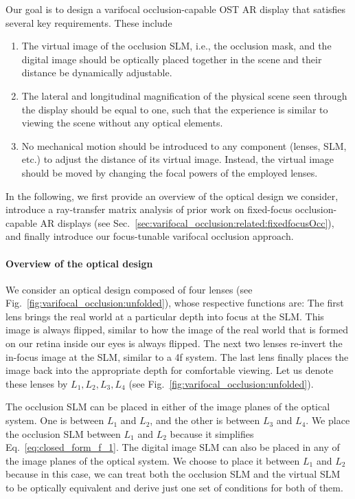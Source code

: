 
Our goal is to design a varifocal occlusion-capable OST AR display that satisfies several key requirements. These include 
%
\begin{enumerate}
    \item The virtual image of the occlusion SLM, i.e., the occlusion mask, and the digital image should be optically placed together in the scene and their distance be dynamically adjustable.
    \item The lateral and longitudinal magnification of the physical scene seen through the display should be equal to one, such that the experience is similar to viewing the scene without any optical elements.
    \item No mechanical motion should be introduced to any component (lenses, SLM, etc.) to adjust the distance of its virtual image. Instead, the virtual image should be moved by changing the focal powers of the employed lenses.
\end{enumerate}
%

In the following, we first provide an overview of the optical design we consider, introduce a ray-transfer matrix analysis of prior work on fixed-focus occlusion-capable AR displays (see Sec.~\ref{sec:varifocal_occlusion:related:fixedfocusOcc}), and finally introduce our focus-tunable varifocal occlusion approach.

\paragraph{\textbf{Overview of the optical design}}
We consider an optical design composed of four lenses (see Fig.~\ref{fig:varifocal_occlusion:unfolded}), whose respective functions are: The first lens brings the real world at a particular depth into focus at the SLM. This image is always flipped, similar to how the image of the real world that is formed on our retina inside our eyes is always flipped. The next two lenses re-invert the in-focus image at the SLM, similar to a 4f system. The last lens finally places the image back into the appropriate depth for comfortable viewing. Let us denote these lenses by $L_1,L_2,L_3,L_4$ (see Fig.~\ref{fig:varifocal_occlusion:unfolded}).

The occlusion SLM can be placed in either of the image planes of the optical system. One is between $L_1$ and $L_2$, and the other is between $L_3$ and $L_4$. We place the occlusion SLM between $L_1$ and $L_2$ because it simplifies Eq.~\eqref{eq:closed_form_f_1}. The digital image SLM can also be placed in any of the image planes of the optical system. We choose to place it between $L_1$ and $L_2$ because in this case, we can treat both the occlusion SLM and the virtual SLM to be optically equivalent and derive just one set of conditions for both of them.

